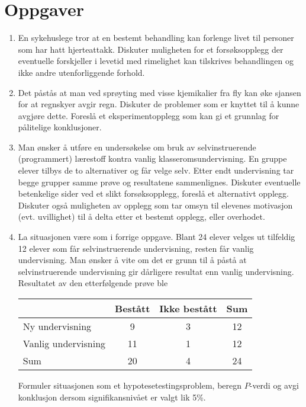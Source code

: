 \section{Oppgaver}
\small
\begin{enumerate}
\item 
En sykehuslege tror at en bestemt behandling kan forlenge livet til
personer som har hatt hjerteattakk.  Diskuter muligheten for et
forsøksopplegg der eventuelle forskjeller i levetid med rimelighet
kan tilskrives behandlingen og ikke andre utenforliggende forhold.

\item
Det påstås at man ved sprøyting med visse kjemikalier fra 
fly kan øke sjansen for at regnskyer avgir regn.  Diskuter de 
problemer som er knyttet til å kunne avgjøre dette.  Foreslå
et eksperimentopplegg som kan gi et grunnlag for pålitelige
konklusjoner.

\item
Man ønsker å utføre en undersøkelse om bruk av 
selvinstruerende (programmert) lærestoff kontra vanlig 
klasseromsundervisning.  En gruppe elever tilbys de to alternativer og 
får velge selv.  Etter endt undervisning tar begge grupper samme
prøve og resultatene sammenlignes.  Diskuter eventuelle betenkelige
sider ved et slikt forsøksopplegg, foreslå et alternativt
opplegg.  Diskuter også muligheten av opplegg som tar omsyn til
elevenes motivasjon (evt. uvillighet) til å delta etter et bestemt
opplegg, eller overhodet.

\item
La situasjonen være som i forrige oppgave.  Blant 24 elever velges
ut tilfeldig 12 elever som får selvinstruerende undervisning,
resten får vanlig undervisning.  Man ønsker å vite om det
er grunn til å påstå at selvinstruerende undervisning gir
dårligere resultat enn vanlig undervisning.  Resultatet av den
etterfølgende prøve ble
\begin{center}
\begin{tabular}{l|cc|c} 
                     &  Bestått  &  Ikke bestått  &   Sum \\ \hline
Ny undervisning      &      9        &       3            &    12 \\
Vanlig undervisning  &     11        &       1            &    12 \\ \hline
Sum                  &     20        &       4            &    24 \\ \hline
\end{tabular}
\end{center}
Formuler situasjonen som et hypotesetestingsproblem, beregn $P$-verdi
og avgi konklusjon dersom signifikansnivået er valgt lik 5\%.


\end{enumerate}
